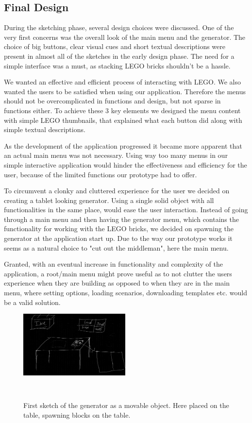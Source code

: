 \subsection{Final Design}
During the sketching phase, several design choices were discussed. One of the very first concerns was the overall look of the main menu and the generator. The choice of big buttons, clear visual cues and short textual descriptions were present in almost all of the sketches in the early design phase. The need for a simple interface was a must, as stacking LEGO bricks shouldn't be a hassle. \par
We wanted an effective and efficient process of interacting with LEGO. We also wanted the users to be satisfied when using our application. Therefore the menus should not be overcomplicated in functions and design, but not sparse in functions either. To achieve these 3 key elements we designed the menu content with simple LEGO thumbnails, that explained what each button did along with simple textual descriptions. \par
As the development of the application progressed it became more  apparent that an actual main menu was not necessary. Using way too many menus in our simple interactive application would hinder the effectiveness and efficiency for the user, because of the limited functions our prototype had to offer. \par 
To circumvent a clonky and cluttered experience for the user we decided on creating a tablet looking generator. Using a single solid object with all functionalities in the same place, would ease the user interaction. Instead of going through a main menu and then having the generator menu, which contains the functionality for working with the LEGO bricks, we decided on spawning the generator at the application start up. Due to the way our prototype works it seems as a natural choice to "cut out the middleman", here the main menu.  \par 
Granted, with an eventual increase in functionality and complexity of the application, a root/main menu might prove useful as to not clutter the users experience when they are building as opposed to when they are in the main menu, where setting options, loading scenarios, downloading templates etc. would be a valid solution.\par
\begin{figure}[t]
	\centering
	\includegraphics[width=210px]{figures/Generator/gen6.png}
	\caption{First sketch of the generator as a movable object. Here placed on the table, spawning blocks on the table.}~\label{fig:finaldesign}
\end{figure}
